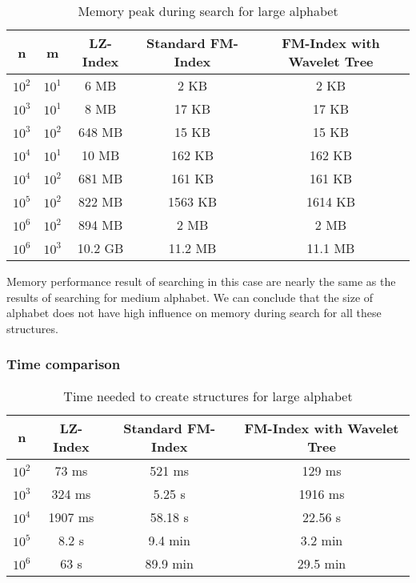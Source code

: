 \begin{table}[H]
\begin{center}
\caption{Memory peak during search for large alphabet}
\begin{tabular}{|c|c|c|c|c|}
\hline
\rowcolor[HTML]{C0C0C0}
n & m & LZ-Index & Standard FM-Index & FM-Index with Wavelet Tree \\ \hline
$10^{2}$ & $10^{1}$ & 6 MB & 2 KB & 2 KB \\ \hline
$10^{3}$ & $10^{1}$ & 8 MB & 17 KB & 17 KB \\ \hline
$10^{3}$ & $10^{2}$ & 648 MB & 15 KB & 15 KB \\ \hline
$10^{4}$ & $10^{1}$ & 10 MB & 162 KB & 162 KB \\ \hline
$10^{4}$ & $10^{2}$ & 681 MB & 161 KB & 161 KB \\ \hline
$10^{5}$ & $10^{2}$ & 822 MB & 1563 KB & 1614 KB \\ \hline
$10^{6}$ & $10^{2}$ & 894 MB & 2 MB & 2 MB \\ \hline
$10^{6}$ & $10^{3}$ & 10.2 GB & 11.2 MB & 11.1 MB \\ \hline
\end{tabular}
\end{center}
\end{table}

Memory performance result of searching in this case are nearly the same as the results of searching for medium alphabet. We can conclude that the size of alphabet does not have high influence on memory during search for all these structures.

\subsubsection{Time comparison}

\begin{table}[H]
\begin{center}
\caption{Time needed to create structures for large alphabet}
\begin{tabular}{|c|c|c|c|}
\hline
\rowcolor[HTML]{C0C0C0}
n & LZ-Index & Standard FM-Index & FM-Index with Wavelet Tree \\ \hline
$10^{2}$ & 73 ms & 521 ms & 129 ms \\ \hline
$10^{3}$ & 324 ms & 5.25 s & 1916 ms \\ \hline
$10^{4}$ & 1907 ms & 58.18 s & 22.56 s \\ \hline
$10^{5}$ & 8.2 s & 9.4 min & 3.2 min \\ \hline
$10^{6}$ & 63 s & 89.9 min & 29.5 min \\ \hline
\end{tabular}
\end{center}
\end{table}

